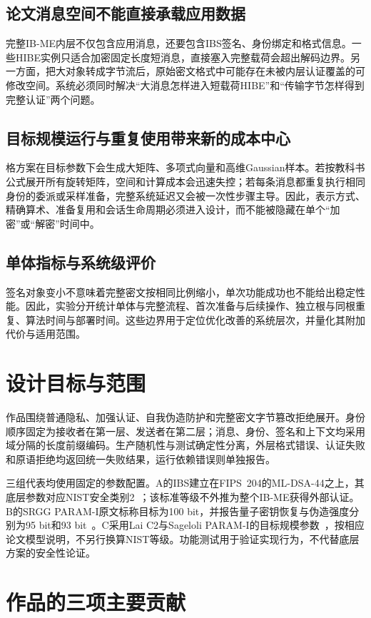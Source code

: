 \documentclass[UTF8,a4paper,12pt,oneside,openany,fontset=fandol]{ctexrep}
\begin{document}
\subsection{论文消息空间不能直接承载应用数据}
完整IB-ME内层不仅包含应用消息，还要包含IBS签名、身份绑定和格式信息。一些HIBE实例只适合加密固定长度短消息，直接塞入完整载荷会超出解码边界。另一方面，把大对象转成字节流后，原始密文格式中可能存在未被内层认证覆盖的可修改空间。系统必须同时解决“大消息怎样进入短载荷HIBE”和“传输字节怎样得到完整认证”两个问题。

\subsection{目标规模运行与重复使用带来新的成本中心}
格方案在目标参数下会生成大矩阵、多项式向量和高维Gaussian样本。若按教科书公式展开所有旋转矩阵，空间和计算成本会迅速失控；若每条消息都重复执行相同身份的委派或采样准备，完整系统延迟又会被一次性步骤主导。因此，表示方式、精确算术、准备复用和会话生命周期必须进入设计，而不能被隐藏在单个“加密”或“解密”时间中。

\subsection{单体指标与系统级评价}
签名对象变小不意味着完整密文按相同比例缩小，单次功能成功也不能给出稳定性能。因此，实验分开统计单体与完整流程、首次准备与后续操作、独立根与同根重复、算法时间与部署时间。这些边界用于定位优化改善的系统层次，并量化其附加代价与适用范围。

\section{设计目标与范围}
作品围绕普通隐私、加强认证、自我伪造防护和完整密文字节篡改拒绝展开。身份顺序固定为接收者在第一层、发送者在第二层；消息、身份、签名和上下文均采用域分隔的长度前缀编码。生产随机性与测试确定性分离，外层格式错误、认证失败和原语拒绝均返回统一失败结果，运行依赖错误则单独报告。

三组代表均使用固定的参数配置。A的IBS建立在FIPS~204的ML-DSA-44之上，其底层参数对应NIST安全类别2~\cite{nist2024fips204}；该标准等级不外推为整个IB-ME获得外部认证。B的SRGG PARAM-I原文标称目标为100 bit，并报告量子密钥恢复与伪造强度分别为95 bit和93 bit~\cite{jia2025ibs}。C采用Lai C2与Sageloli PARAM-I的目标规模参数~\cite{lai2015trapdoors,sageloli2023ibs}，按相应论文模型说明，不另行换算NIST等级。功能测试用于验证实现行为，不代替底层方案的安全性论证。

\section{作品的三项主要贡献}
\end{document}
